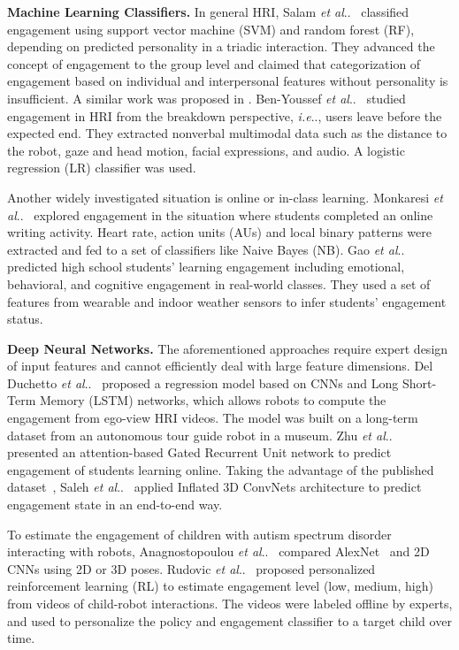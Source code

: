 \documentclass[twocolumn]{svjour3}
\makeatletter
\DeclareRobustCommand\onedot{\futurelet\@let@token\@onedot}
\def\@onedot{\ifx\@let@token.\else.\null\fi\xspace}
\def\ie{\emph{i.e}\onedot} \def\Ie{\emph{I.e}\onedot}
\def\etal{\emph{et al}\onedot}
\makeatother
\begin{document}
\textbf{Machine Learning Classifiers.} In general HRI, Salam \etal~\cite{Salam2017Fully} classified engagement using support vector machine (SVM) and random forest (RF), depending on predicted personality in a triadic interaction. They advanced the concept of engagement to the group level and claimed that categorization of engagement based on individual and interpersonal features without personality is insufficient. A similar work was proposed in \cite{Celiktutan2019Multimodal}. Ben-Youssef \etal~\cite{BenYoussef2019Early} studied engagement in HRI from the breakdown perspective, \ie, users leave before the expected end. They extracted nonverbal multimodal data such as the distance to the robot, gaze and head motion, facial expressions, and audio. A logistic regression (LR) classifier was used. 

Another widely investigated situation is online or in-class learning. Monkaresi \etal~\cite{Monkaresi2017Automated} explored engagement in the situation where students completed an online writing activity. Heart rate, action units (AUs) and local binary patterns were extracted and fed to a set of classifiers like Naive Bayes (NB). Gao \etal~\cite{Gao2020NGage} predicted high school students' learning engagement including emotional, behavioral, and cognitive engagement in real-world classes. They used a set of features from wearable and indoor weather sensors to infer students' engagement status.

\textbf{Deep Neural Networks.} The aforementioned approaches require expert design of input features and cannot efficiently deal with large feature dimensions. Del Duchetto \etal~\cite{DelDuchetto2020Are} proposed a regression model based on CNNs and Long Short-Term Memory (LSTM) networks, which allows robots to compute the engagement from ego-view HRI videos. The model was built on a long-term dataset from an autonomous tour guide robot in a museum. Zhu \etal~\cite{Zhu2020Multirate} presented an attention-based Gated Recurrent Unit network to predict engagement of students learning online. Taking the advantage of the published dataset~\cite{BenYoussef2019Early}, Saleh \etal~\cite{Saleh2021Improving} applied Inflated 3D ConvNets architecture to predict engagement state in an end-to-end way.

To estimate the engagement of children with autism spectrum disorder interacting with robots, Anagnostopoulou \etal~\cite{Anagnostopoulou2021Engagement} compared AlexNet~\cite{Krizhevsky2012Imagenet} and 2D CNNs using 2D or 3D poses. Rudovic \etal~\cite{Rudovic2019Personalized} proposed  personalized reinforcement learning (RL) to estimate engagement level (low, medium, high) from videos of child-robot interactions. The videos were labeled offline by experts, and used to personalize the policy and engagement classifier to a target child over time.
\end{document}
